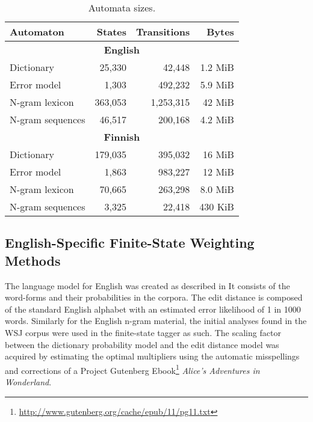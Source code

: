 \documentclass{llncs}
\begin{document}
\begin{table}
\caption{Automata sizes\label{table:sizes}.}
\begin{center}
\begin{tabular}{lrrr}
    Automaton & States & Transitions & Bytes \\
    \hline
    \multicolumn{4}{c}{\textbf{English}} \\
    \hline
    Dictionary & 25,330 & 42,448 & 1.2 MiB \\
    Error model & 1,303 & 492,232 & 5.9 MiB \\
    N-gram lexicon & 363,053 & 1,253,315 & 42 MiB \\
    N-gram sequences & 46,517 & 200,168 & 4.2 MiB \\
    \hline
    \multicolumn{4}{c}{\textbf{Finnish}} \\
    \hline
    Dictionary & 179,035 & 395,032 & 16 MiB \\
    Error model & 1,863 & 983,227 & 12 MiB \\
    N-gram lexicon & 70,665 & 263,298 & 8.0 MiB \\
    N-gram sequences & 3,325 & 22,418 & 430 KiB \\
    \hline
\end{tabular}
\end{center}
\end{table}

\subsection{English-Specific Finite-State Weighting Methods}

The language model for English was created as described in
\cite{norvig/2010}
  It consists of the word-forms and their  probabilities in the
corpora. The edit distance is composed of the standard English alphabet with
an estimated error likelihood of 1 in 1000 words.  Similarly for the English n-gram
material, the initial analyses found in the WSJ corpus were used in the
finite-state tagger as such. The scaling factor between the dictionary probability model and
the edit distance model was acquired by estimating the optimal multipliers using the automatic
misspellings and corrections of a Project Gutenberg Ebook\footnote{\url{http://www.gutenberg.org/cache/epub/11/pg11.txt}} \emph{Alice's Adventures in Wonderland}.
\end{document}
